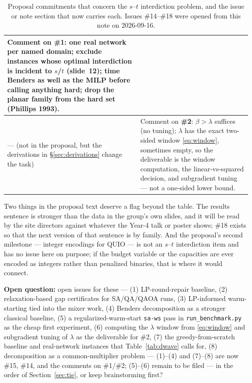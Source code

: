 \documentclass[11pt]{article}
\newcommand{\code}[1]{\texttt{#1}}
\begin{document}
\begin{table}[h]
\begin{tabular}{p{}p{}}
Comment on \textbf{\#1}: one real network per named domain; exclude instances whose optimal interdiction is incident to $s$/$t$ (slide~12); time Benders as well as the MILP before calling anything hard; drop the planar family from the hard set (Phillips 1993). \\
\midrule
--- (not in the proposal, but the derivations in \S\ref{sec:derivations} change the task) &
Comment on \textbf{\#2}: $\beta > \lambda$ suffices (no tuning); $\lambda$ has the exact two-sided window \eqref{eq:window}, sometimes empty, so the deliverable is the window computation, the linear-vs-squared decision, and subgradient tuning --- not a one-sided lower bound. \\
\bottomrule
\end{tabular}
\caption{Proposal commitments that concern the $s$--$t$ interdiction problem, and the issue or note section that now carries each. Issues \#14--\#18 were opened from this note on 2026-09-16.}
\label{tab:proposal}
\end{table}

Two things in the proposal text deserve a flag beyond the table. The results sentence is stronger than the data in the group's own slides, and it will be read by the site directors against whatever the Year-4 talk or poster shows; \#18 exists so that the next version of that sentence is by family. And the proposal's second milestone --- integer encodings for QUIO --- is not an $s$--$t$ interdiction item and has no issue here on purpose; if the budget variable or the capacities are ever encoded as integers rather than penalized binaries, that is where it would connect.

\bigskip
\noindent\textbf{Open question:} open issues for these --- (1) LP-round-repair baseline, (2) relaxation-based gap certificates for SA/QA/QAOA runs, (3) LP-informed warm-starting tied into the mixer work, (4) Benders decomposition as a stronger classical baseline, (5) a regularized-warm-start \code{sa-ws} pass in \code{run\_benchmark.py} as the cheap first experiment, (6) computing the $\lambda$ window from \eqref{eq:window} and subgradient tuning of $\lambda$ as the deliverable for \#2, (7) the greedy-from-scratch baseline and real-network instances that Table~\ref{tab:dwave} calls for, (8) decomposition as a common-multiplier problem --- (1)--(4) and (7)--(8) are now \#15, \#14, and the comments on \#1/\#2; (5)--(6) remain to be filed --- in the order of Section~\ref{sec:tie}, or keep brainstorming first?
\end{document}
